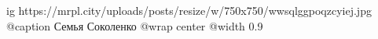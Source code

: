  
 
 
 
 

\ifcmt
  ig https://mrpl.city/uploads/posts/resize/w/750x750/wwsqlggpoqzcyiej.jpg
	@caption Семья Соколенко
  @wrap center
  @width 0.9
\fi
